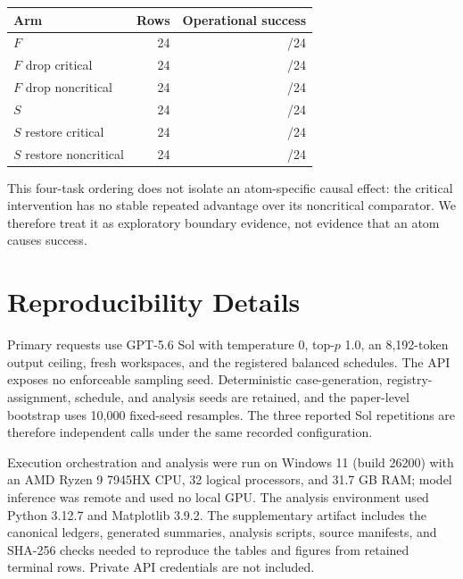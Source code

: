 \begin{center}
\label{tab:focused-restore-drop}
\footnotesize
\setlength{\tabcolsep}{5pt}
\begin{tabular}{lrr}
\toprule
Arm & Rows & Operational success \\
\midrule
$F$ & 24 & \FocusedFSuccess{}/24 \\
$F$ drop critical & 24 & \FocusedFDropCriticalSuccess{}/24 \\
$F$ drop noncritical & 24 & \FocusedFDropNoncriticalSuccess{}/24 \\
$S$ & 24 & \FocusedSSuccess{}/24 \\
$S$ restore critical & 24 & \FocusedSRestoreCriticalSuccess{}/24 \\
$S$ restore noncritical & 24 & \FocusedSRestoreNoncriticalSuccess{}/24 \\
\bottomrule
\end{tabular}
\end{center}

This four-task ordering does not isolate an atom-specific causal effect: the critical intervention has no stable repeated advantage over its noncritical comparator. We therefore treat it as exploratory boundary evidence, not evidence that an atom causes success.

\section{Reproducibility Details}
\label{app:reproducibility}

Primary requests use GPT-5.6 Sol with temperature 0, top-$p$ 1.0, an 8,192-token output ceiling, fresh workspaces, and the registered balanced schedules. The API exposes no enforceable sampling seed. Deterministic case-generation, registry-assignment, schedule, and analysis seeds are retained, and the paper-level bootstrap uses 10,000 fixed-seed resamples. The three reported Sol repetitions are therefore independent calls under the same recorded configuration.

Execution orchestration and analysis were run on Windows 11 (build 26200) with an AMD Ryzen 9 7945HX CPU, 32 logical processors, and 31.7 GB RAM; model inference was remote and used no local GPU. The analysis environment used Python 3.12.7 and Matplotlib 3.9.2. The supplementary artifact includes the canonical ledgers, generated summaries, analysis scripts, source manifests, and SHA-256 checks needed to reproduce the tables and figures from retained terminal rows. Private API credentials are not included.

